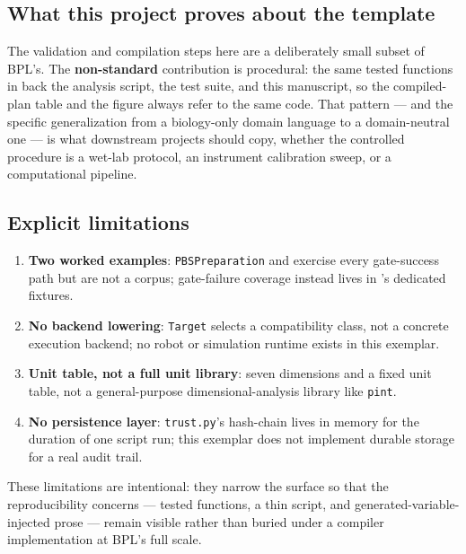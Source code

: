 \documentclass[
  english,
]{article}
\providecommand{\tightlist}{%
  \setlength{\itemsep}{0pt}\setlength{\parskip}{0pt}}
\begin{document}
\subsection{What this project proves about the
template}\label{what-this-project-proves-about-the-template}

The validation and compilation steps here are a deliberately small
subset of BPL's. The \textbf{non-standard} contribution is procedural:
the same tested functions in  back the
analysis script, the test suite, and this manuscript, so the
compiled-plan table and the figure always refer to the same code. That
pattern --- and the specific generalization from a biology-only domain
language to a domain-neutral one --- is what downstream projects should
copy, whether the controlled procedure is a wet-lab protocol, an
instrument calibration sweep, or a computational pipeline.

\subsection{Explicit limitations}\label{explicit-limitations}

\begin{enumerate}
\def\labelenumi{\arabic{enumi}.}
\tightlist
\item
  \textbf{Two worked examples}: \texttt{PBSPreparation} and
   exercise every gate-success path but
  are not a corpus; gate-failure coverage instead lives in
  's dedicated fixtures.
\item
  \textbf{No backend lowering}: \texttt{Target} selects a compatibility
  class, not a concrete execution backend; no robot or simulation
  runtime exists in this exemplar.
\item
  \textbf{Unit table, not a full unit library}: seven dimensions and a
  fixed unit table, not a general-purpose dimensional-analysis library
  like \texttt{pint}.
\item
  \textbf{No persistence layer}: \texttt{trust.py}'s hash-chain lives in
  memory for the duration of one script run; this exemplar does not
  implement durable storage for a real audit trail.
\end{enumerate}

These limitations are intentional: they narrow the surface so that the
reproducibility concerns --- tested functions, a thin script, and
generated-variable-injected prose --- remain visible rather than buried
under a compiler implementation at BPL's full scale.
\end{document}
